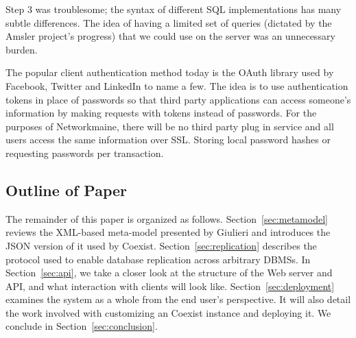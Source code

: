 Step 3 was troublesome; the syntax of different SQL implementations has many
subtle differences. The idea of having a limited set of queries (dictated by the
Amsler project's progress) that we could use on the server was an unnecessary
burden.


The popular client authentication method today is the OAuth
library\cite{_oauth_????} used by Facebook, Twitter and LinkedIn to name a few.
The idea is to use authentication tokens in place of passwords so that third
party applications can access someone's information by making requests with
tokens instead of passwords. For the purposes of Networkmaine, there will be no
third party plug in service and all users access the same information over SSL.
Storing local password hashes or requesting passwords per transaction.

\subsection{Outline of Paper} \label{sec:outline}


The remainder of this paper is organized as follows. Section~\ref{sec:metamodel}
reviews the XML-based meta-model presented by Giulieri and
introduces the JSON version of it used by Coexist.
Section~\ref{sec:replication} describes the protocol used to enable database replication
across arbitrary DBMSs. In Section~\ref{sec:api}, we take a closer look at the
structure of the Web server and API, and what interaction with clients will look
like. Section~\ref{sec:deployment} examines the system as a whole from the end
user's perspective. It will also detail the work involved with customizing an
Coexist instance and deploying it. We conclude in Section~\ref{sec:conclusion}.


